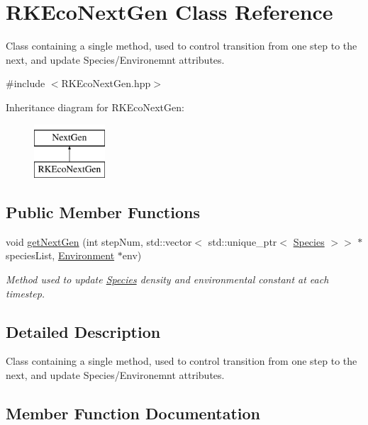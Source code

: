 \hypertarget{classRKEcoNextGen}{}\section{R\+K\+Eco\+Next\+Gen Class Reference}
\label{classRKEcoNextGen}


Class containing a single method, used to control transition from one step to the next, and update Species/\+Environemnt attributes.  




{\ttfamily \#include $<$R\+K\+Eco\+Next\+Gen.\+hpp$>$}

Inheritance diagram for R\+K\+Eco\+Next\+Gen\+:\begin{figure}[H]
\begin{center}
\leavevmode
\includegraphics[height=2.000000cm]{classRKEcoNextGen}
\end{center}
\end{figure}
\subsection*{Public Member Functions}
\begin{DoxyCompactItemize}
\item 
void \hyperlink{classRKEcoNextGen_a26225c08c43f3499d98358ff2ecf613f}{get\+Next\+Gen} (int step\+Num, std\+::vector$<$ std\+::unique\+\_\+ptr$<$ \hyperlink{classSpecies}{Species} $>$$>$ $\ast$species\+List, \hyperlink{classEnvironment}{Environment} $\ast$env)
\begin{DoxyCompactList}\small\item\em Method used to update \hyperlink{classSpecies}{Species} density and environmental constant at each timestep. \end{DoxyCompactList}\end{DoxyCompactItemize}


\subsection{Detailed Description}
Class containing a single method, used to control transition from one step to the next, and update Species/\+Environemnt attributes. 

\subsection{Member Function Documentation}
\mbox{\label{classRKEcoNextGen_a26225c08c43f3499d98358ff2ecf613f}} 
